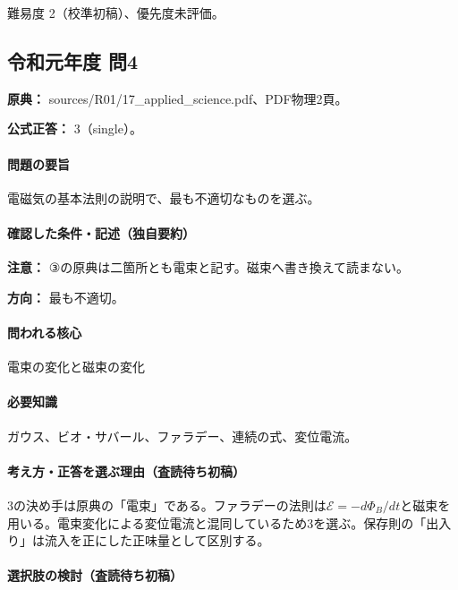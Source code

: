 \par 難易度 2（校準初稿）、優先度未評価。

\subsection{令和元年度 問4}
\label{q:r01-reg-applied-04}

\noindent\textbf{原典：} sources/R01/17\_applied\_science.pdf、PDF物理2頁。

\textbf{公式正答：} 3（single）。

\paragraph{問題の要旨} 電磁気の基本法則の説明で、最も不適切なものを選ぶ。

\paragraph{確認した条件・記述（独自要約）}\mbox{}\par

\noindent\textbf{注意：} ③の原典は二箇所とも電束と記す。磁束へ書き換えて読まない。\par

\noindent\textbf{方向：} 最も不適切。\par

\paragraph{問われる核心} 電束の変化と磁束の変化

\paragraph{必要知識} ガウス、ビオ・サバール、ファラデー、連続の式、変位電流。

\paragraph{考え方・正答を選ぶ理由（査読待ち初稿）} 3の決め手は原典の「電束」である。ファラデーの法則は\(\mathcal E=-d\Phi_B/dt\)と磁束を用いる。電束変化による変位電流と混同しているため3を選ぶ。保存則の「出入り」は流入を正にした正味量として区別する。

\paragraph{選択肢の検討（査読待ち初稿）}\mbox{}\par

